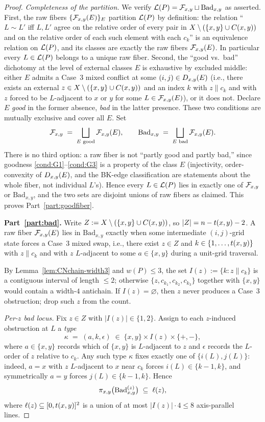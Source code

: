 \begin{proof}
\smallskip
\emph{Completeness of the partition.}
We verify $\mathcal{L}(P)=\mathcal{F}_{x,y}\sqcup\mathrm{Bad}_{x,y}$ as asserted.
First, the raw fibers $\{\mathcal{F}_{x,y}(E)\}_E$ partition $\mathcal{L}(P)$ by definition: the relation
``$L\sim L'$ iff $L,L'$ agree on the relative order of every pair in
$X\setminus(\{x,y\}\cup C(x,y))$ and on the relative order of each such element with
each $c_k$'' is an equivalence relation on $\mathcal{L}(P)$, and its classes are exactly
the raw fibers $\mathcal{F}_{x,y}(E)$. In particular every $L\in\mathcal{L}(P)$ belongs to a unique
raw fiber.
Second, the ``good vs.\ bad'' dichotomy at the level of external classes $E$ is
exhaustive by excluded middle: either $E$ admits a Case~3 mixed conflict at some
$(i,j)\in D_{x,y}(E)$ (i.e., there exists an external $z\in X\setminus(\{x,y\}\cup C(x,y))$
and an index $k$ with $z\parallel c_k$ and with $z$ forced to be $L$-adjacent
to $x$ or $y$ for some $L\in\mathcal{F}_{x,y}(E)$), or it does not. Declare
$E$ \emph{good} in the former absence, \emph{bad} in the latter presence. These
two conditions are mutually exclusive and cover all $E$. Set
\[
\mathcal{F}_{x,y} \;=\; \bigsqcup_{E\text{ good}}\mathcal{F}_{x,y}(E),\qquad
\mathrm{Bad}_{x,y} \;=\; \bigsqcup_{E\text{ bad}}\mathcal{F}_{x,y}(E).
\]
There is no third option: a raw fiber is not ``partly good and partly bad,'' since
goodness \ref{cond:G1}--\ref{cond:G3} is a property of the class $E$ (injectivity,
order-convexity of $D_{x,y}(E)$, and the BK-edge classification are statements about
the whole fiber, not individual $L$'s). Hence every $L\in\mathcal{L}(P)$ lies in exactly one
of $\mathcal{F}_{x,y}$ or $\mathrm{Bad}_{x,y}$, and the two sets are disjoint unions of raw
fibers as claimed. This proves Part~\ref{part:goodfiber}.

\smallskip
\textbf{Part~\ref{part:bad}.}
Write $Z:=X\setminus(\{x,y\}\cup C(x,y))$, so $|Z|=n-t(x,y)-2$.
A raw fiber $\mathcal{F}_{x,y}(E)$ lies in $\mathrm{Bad}_{x,y}$ exactly when some
intermediate $(i,j)$-grid state forces a Case~3 mixed swap, i.e., there
exist $z\in Z$ and $k\in\{1,\dots,t(x,y)\}$ with $z\parallel c_k$ and with
$z$ $L$-adjacent to some $a\in\{x,y\}$ during a unit-grid traversal.

By Lemma~\ref{lem:CNchain-width3} and $w(P)\le 3$, the set
$I(z):=\{k:z\parallel c_k\}$ is a contiguous interval of length $\le 2$;
otherwise $\{z,c_{k_1},c_{k_2},c_{k_3}\}$ together with $\{x,y\}$ would
contain a width-$4$ antichain. If $I(z)=\varnothing$, then $z$ never
produces a Case~3 obstruction; drop such $z$ from the count.

\emph{Per-$z$ bad locus.} Fix $z\in Z$ with $|I(z)|\in\{1,2\}$.
Assign to each $z$-induced obstruction at $L$ a \emph{type}
\[
\kappa\;=\;(a,k,\epsilon)\;\in\;\{x,y\}\times I(z)\times\{+,-\},
\]
where $a\in\{x,y\}$ records which of $\{x,y\}$ is $L$-adjacent to $z$ and
$\epsilon$ records the $L$-order of $z$ relative to $c_k$. Any such type
$\kappa$ fixes exactly one of $\{i(L),j(L)\}$: indeed, $a=x$ with $z$
$L$-adjacent to $x$ near $c_k$ forces $i(L)\in\{k-1,k\}$, and symmetrically
$a=y$ forces $j(L)\in\{k-1,k\}$. Hence
\[
\pi_{x,y}\bigl(\mathrm{Bad}_{x,y}^{(z)}\bigr)\;\subseteq\;\ell(z),
\]
where $\ell(z)\subseteq[0,t(x,y)]^2$ is a union of at most
$|I(z)|\cdot 4\le 8$ axis-parallel lines.


\end{proof}
